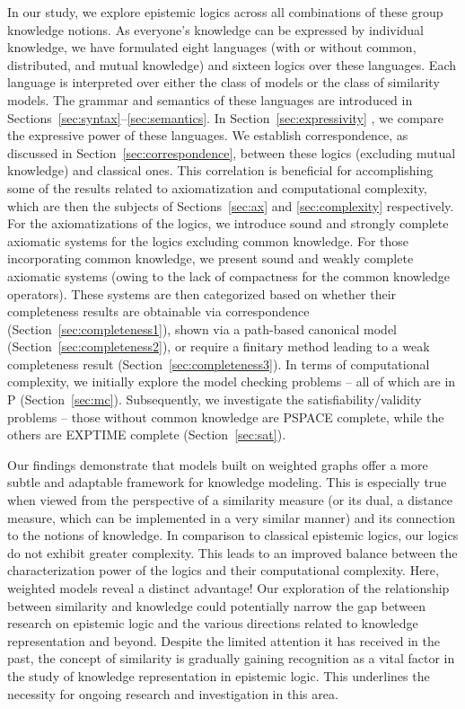 \documentclass{article}
\begin{document}
In our study, we explore epistemic logics across all combinations of these group knowledge notions. As everyone's knowledge can be expressed by individual knowledge, we have formulated eight languages (with or without common, distributed, and mutual knowledge) and sixteen logics over these languages. Each language is interpreted over either the class of models or the class of similarity models. The grammar and semantics of these languages are introduced in Sections~\ref{sec:syntax}--\ref{sec:semantics}.
%
In Section~\ref{sec:expressivity} , we compare the expressive power of these languages. We establish correspondence, as discussed in Section~\ref{sec:correspondence}, between these logics (excluding mutual knowledge) and classical ones. This correlation is beneficial for accomplishing some of the results related to axiomatization and computational complexity, which are then the subjects of Sections~\ref{sec:ax} and \ref{sec:complexity} respectively.
%
For the axiomatizations of the logics, we introduce sound and strongly complete axiomatic systems for the logics excluding common knowledge. For those incorporating common knowledge, we present sound and weakly complete axiomatic systems (owing to the lack of compactness for the common knowledge operators). These systems are then categorized based on whether their completeness results are obtainable via correspondence (Section~\ref{sec:completeness1}), shown via a path-based canonical model (Section~\ref{sec:completeness2}), or require a finitary method leading to a weak completeness result (Section~\ref{sec:completeness3}).
%
In terms of computational complexity, we initially explore the model checking problems -- all of which are in P (Section~\ref{sec:mc}). Subsequently, we investigate the satisfiability/validity problems -- those without common knowledge are PSPACE complete, while the others are EXPTIME complete (Section~\ref{sec:sat}).

Our findings demonstrate that models built on weighted graphs offer a more subtle and adaptable framework for knowledge modeling. This is especially true when viewed from the perspective of a similarity measure (or its dual, a distance measure, which can be implemented in a very similar manner) and its connection to the notions of knowledge. In comparison to classical epistemic logics, our logics do not exhibit greater complexity. This leads to an improved balance between the characterization power of the logics and their computational complexity. Here, weighted models reveal a distinct advantage! Our exploration of the relationship between similarity and knowledge could potentially narrow the gap between research on epistemic logic and the various directions related to knowledge representation and beyond. Despite the limited attention it has received in the past, the concept of similarity is gradually gaining recognition as a vital factor in the study of knowledge representation in epistemic logic. This underlines the necessity for ongoing research and investigation in this area.
\end{document}
